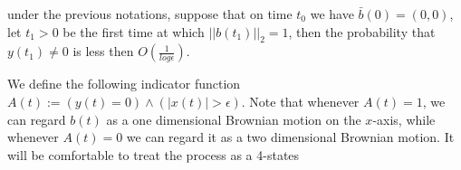 {\begin{propos}\label{prop:reph}
under the previous notations, suppose that on time $t_0$ we have
$\bar{b}(0)=(0,0)$, let $t_1>0$ be the first time at which
$||b(t_1)||_2=1$, then the probability that $y(t_1)\neq0$ is less then
$O(\frac1{log\epsilon})$.
\end{propos}

We define the following indicator function
$A(t):=(y(t)=0)\wedge(|x(t)|>\epsilon)$. Note that whenever $A(t)=1$,
we can regard $b(t)$ as a one dimensional Brownian motion on the
$x$-axis, while whenever $A(t)=0$ we can regard it as a two
dimensional Brownian motion. It will be comfortable to treat the
process as a 4-states

}

